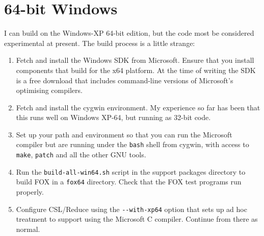 \documentclass[11pt]{article}
\begin{document}
\section{64-bit Windows}
I can build on the Windows-XP 64-bit edition, but the code most be considered
experimental at present. The build process is a little strange:
\begin{enumerate}
\item Fetch and install the Windows SDK from Microsoft. Ensure that you
install components that build for the x64 platform. At the time of writing the
SDK is a free download that includes command-line versions of Microsoft's
optimising compilers.
\item Fetch and install the cygwin environment. My experience so far has been
that this runs well on Windows XP-64, but running as 32-bit code.
\item Set up your path and environment so that you can run the Microsoft
compiler but are running under the \verb.bash. shell from cygwin, with access
to \verb.make., \verb.patch. and all the other GNU tools.
\item Run the \verb+build-all-win64.sh+ script in the support packages
directory to build FOX in a \verb.fox64. directory. Check that the FOX
test programs run properly.
\item Configure CSL/Reduce using the \verb.--with-xp64. option that sets up
ad hoc treatment to support using the Microsoft C compiler. Continue
from there as normal.
\end{enumerate}
\end{document}
